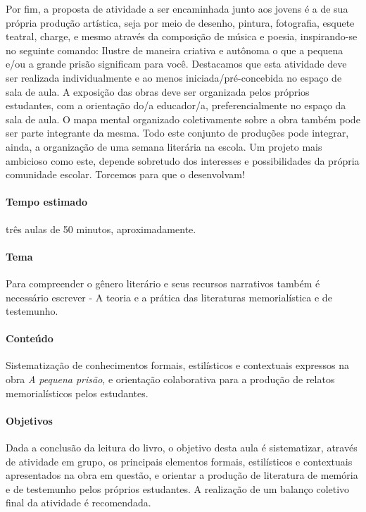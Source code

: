 \documentclass[11pt]{extarticle}
\begin{document}
Por fim, a proposta de atividade a ser encaminhada junto aos jovens é a
de sua própria produção artística, seja por meio de desenho, pintura,
fotografia, esquete teatral, charge, e mesmo através da composição de
música e poesia, inspirando-se no seguinte comando: Ilustre de maneira
criativa e autônoma o que a pequena e/ou a grande prisão significam para
você. Destacamos que esta atividade deve ser realizada individualmente e
ao menos iniciada/pré-concebida no espaço de sala de aula. A exposição
das obras deve ser organizada pelos próprios estudantes, com a
orientação do/a educador/a, preferencialmente no espaço da sala de aula.
O mapa mental organizado coletivamente sobre a obra também pode ser
parte integrante da mesma. Todo este conjunto de produções pode
integrar, ainda, a organização de uma semana literária na escola. Um
projeto mais ambicioso como este, depende sobretudo dos interesses e
possibilidades da própria comunidade escolar. Torcemos para que o
desenvolvam!

\paragraph{Tempo estimado} três aulas de 50 minutos, aproximadamente.

\paragraph{Tema} Para compreender o gênero literário e seus recursos
narrativos também é necessário escrever - A teoria e a prática das
literaturas memorialística e de testemunho.

\paragraph{Conteúdo} Sistematização de conhecimentos formais, estilísticos
e contextuais expressos na obra \emph{A pequena prisão}, e orientação
colaborativa para a produção de relatos memorialísticos pelos
estudantes.

\paragraph{Objetivos} Dada a conclusão da leitura do livro, o objetivo
desta aula é sistematizar, através de atividade em grupo, os principais
elementos formais, estilísticos e contextuais apresentados na obra em
questão, e orientar a produção de literatura de memória e de testemunho
pelos próprios estudantes. A realização de um balanço coletivo final da
atividade é recomendada.
\end{document}
